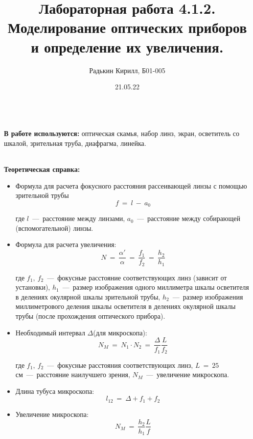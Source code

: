 \documentclass[a4paper, 12pt]{article}
\author{Радькин Кирилл, Б01-005}
\date{21.05.22}
\title{Лабораторная работа 4.1.2. Моделирование оптических приборов и определение их увеличения.}
\begin{document}
    \maketitle

    \textbf{\\В работе используются:} оптическая скамья, набор линз, экран, осветитель со шкалой, зрительная труба, диафрагма, линейка.

    \textbf{\\Теоретическая справка:}
        \begin{itemize}
            \item Формула для расчета фокусного расстояния рассеивающей линзы с помощью зрительной трубы
                \begin{equation}
                    \label{eq1}
                    f~=~l~-~a_0
                \end{equation}

            где $l$~---~расстояние между линзами, $a_0$~---~расстояние между собирающей (вспомогательной) линзы.

            \item Формула для расчета увеличения:
                \begin{equation}
                    \label{eq2}
                    N~=~\dfrac{\alpha'}{\alpha}~=~\dfrac{f_1}{f_2}~=~\dfrac{h_2}{h_1}
                \end{equation}

            где $f_1,~f_2$~---~фокусные расстояние соответствующих линз (зависит от установки), $h_1$~---~размер изображения одного миллиметра шкалы осветителя в делениях окулярной шкалы зрительной трубы, $h_2$~---~размер изображения миллиметрового деления шкалы осветителя в делениях окулярной шкалы трубы (после прохождения оптического прибора).

            \item Необходимый интервал $\Delta$(для микроскопа):
                \begin{equation}
                    \label{eq3}
                    N_M~=~N_1 \cdot N_2~=~\dfrac{\Delta}{f_1} \dfrac{L}{f_2} 
                \end{equation}

            где $f_1,~f_2$~---~фокусные расстояния соответствующих линз, $L~=~25$ см~---~расстояние наилучшего зрения, $N_M$~---~увеличение микроскопа.

            \item Длина тубуса микроскопа:
                \begin{equation}
                    \label{eq4}
                    l_{12}~=~\Delta + f_1 + f_2
                \end{equation}

            \item Увеличение микроскопа:
                \begin{equation}
                    \label{eq5}
                    N_M~=~\dfrac{h_2}{h_1} \dfrac{L}{f}
                \end{equation}
        \end{itemize}
\end{document}
